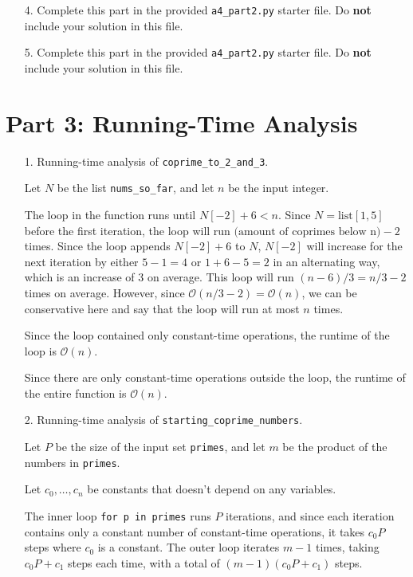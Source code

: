 \documentclass[fontsize=11pt]{article}
\newcommand{\cO}{\mathcal{O}}
\newcommand{\code}[1]{\texttt{#1}}
\begin{document}
\begin{enumerate}
\item[4.]
Complete this part in the provided \texttt{a4\_part2.py} starter file.
Do \textbf{not} include your solution in this file.

\item[5.]
Complete this part in the provided \texttt{a4\_part2.py} starter file.
Do \textbf{not} include your solution in this file.
\end{enumerate}

\newpage

\section*{Part 3: Running-Time Analysis}

\begin{enumerate}
\item[1.]
Running-time analysis of \texttt{coprime\_to\_2\_and\_3}.

Let $N$ be the list \code{nums\_so\_far}, and let $n$ be the input integer. 

The loop in the function runs until $N[-2] + 6 < n$. Since $N = \text{list}[1, 5]$ before the first iteration, the loop will run $\text{(amount of coprimes below n)} - 2$ times. Since the loop appends $N[-2] + 6$ to $N$, $N[-2]$ will increase for the next iteration by either $5 - 1 = 4$ or $1 + 6 - 5 = 2$ in an alternating way, which is an increase of $3$ on average. This loop will run $(n - 6) / 3 = n / 3 - 2$ times on average. However, since $\cO(n / 3 - 2) = \cO(n)$, we can be conservative here and say that the loop will run at most $n$ times.

Since the loop contained only constant-time operations, the runtime of the loop is $\cO(n)$.

Since there are only constant-time operations outside the loop, the runtime of the entire function is $\cO(n)$.

\item[2.] 
Running-time analysis of \texttt{starting\_coprime\_numbers}.

Let $P$ be the size of the input set \code{primes}, and let $m$ be the product of the numbers in \code{primes}.

Let $c_0, \dots, c_n$ be constants that doesn't depend on any variables.

The inner loop \code{for p in primes} runs $P$ iterations, and since each iteration contains only a constant number of constant-time operations, it takes $c_0P$ steps where $c_0$ is a constant. The outer loop iterates $m - 1$ times, taking $c_0P + c_1$ steps each time, with a total of $(m - 1)(c_0P + c_1)$ steps.


\end{enumerate}
\end{document}
